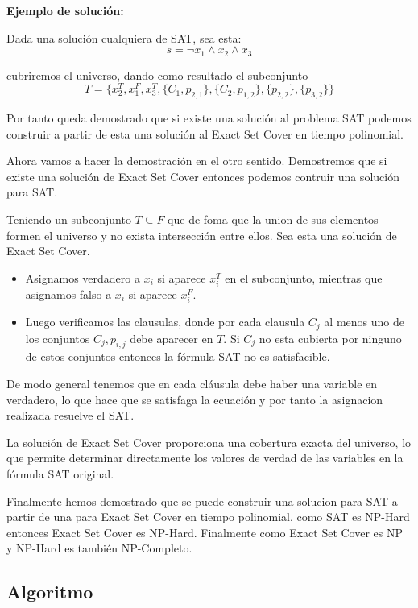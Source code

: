 \documentclass{article}
\begin{document}
\textbf{Ejemplo de solución:}

Dada una solución cualquiera de SAT, sea esta:
\[s = \neg x_1 \wedge x_2 \wedge x_3\]

cubriremos el universo, dando como resultado el subconjunto 
\[T = \{ x_{2}^{T}, x_{1}^{F}, x_{3}^{T}, \{C_1, p_{2,1}\}, \{C_2, p_{1,2}\}, \{p_{2,2}\}, \{p_{3,2}\} \}\]

Por tanto queda demostrado que si existe una solución al problema SAT podemos construir a partir de esta una solución al Exact Set Cover en tiempo polinomial. 

Ahora vamos a hacer la demostración en el otro sentido.
Demostremos que si existe una solución de Exact Set Cover entonces podemos contruir una solución para SAT.

Teniendo un subconjunto $T \subseteq F$ que de foma que la union de sus elementos formen el universo y no exista intersección entre ellos. Sea esta una solución de Exact Set Cover.

\begin{itemize}
    \item Asignamos verdadero a $x_i$  si aparece $x_{i}^{T}$ en el subconjunto, mientras que asignamos falso a $x_i$ si aparece $x_{i}^{F}$.
    \item Luego verificamos las clausulas, donde por cada clausula $C_j$ al menos uno de los conjuntos ${C_j, p_{i,j}}$ debe aparecer en $T$. Si $C_j$ no esta cubierta por ninguno de estos conjuntos entonces la fórmula SAT no es satisfacible.
\end{itemize}

De modo general tenemos que en cada cláusula debe haber una variable en verdadero, lo que hace que se satisfaga la ecuación y por tanto la asignacion realizada resuelve el SAT.

La solución de Exact Set Cover proporciona una cobertura exacta del universo, lo que permite determinar directamente los valores de verdad de las variables en la fórmula SAT original.

Finalmente hemos demostrado que se puede construir una solucion para SAT a partir de una para Exact Set Cover en tiempo polinomial, como SAT es NP-Hard entonces Exact Set Cover es NP-Hard.
Finalmente como Exact Set Cover es NP y NP-Hard es también NP-Completo.


\subsection{Algoritmo}
\end{document}
